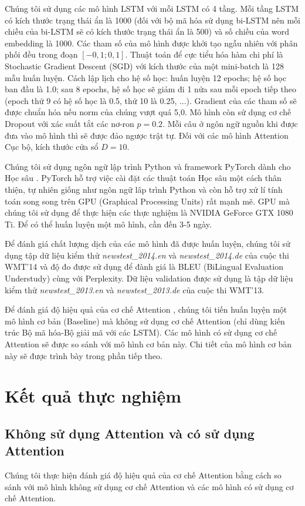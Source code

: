 Chúng tôi sử dụng các mô hình LSTM với mỗi LSTM có 4 tầng. Mỗi tầng LSTM có kích thước trạng thái ẩn là 1000 (đối với bộ mã hóa sử dụng bi-LSTM nên mỗi chiều của bi-LSTM sẽ có kích thước trạng thái ẩn là 500) và số chiều của word embedding là 1000. Các tham số của mô hình được khởi tạo ngẫu nhiên với phân phối đều trong đoạn $[-0,1; 0,1]$. Thuật toán để cực tiểu hóa hàm chi phí là Stochastic Gradient Descent (SGD) với kích thước của một mini-batch là 128 mẫu huấn luyện. Cách lập lịch cho hệ số học: huấn luyện 12 epochs; hệ số học ban đầu là 1.0; sau 8 epochs, hệ số học sẽ giảm đi 1 nửa sau mỗi epoch tiếp theo (epoch thứ 9 có hệ số học là 0.5, thứ 10 là 0.25, ...). Gradient của các tham số sẽ được chuẩn hóa nếu norm của chúng vượt quá 5,0. Mô hình còn sử dụng cơ chế Dropout với xác suất tắt các nơ-ron $p = 0.2$. Mỗi câu ở ngôn ngữ nguồn khi được đưa vào mô hình thì sẽ được đảo ngược trật tự. Đối với các mô hình Attention Cục bộ, kích thước cửa sổ $D = 10$.

Chúng tôi sử dụng ngôn ngữ lập trình Python và framework PyTorch dành cho Học sâu \cite{pytorchworkshop}. PyTorch hỗ trợ việc cài đặt các thuật toán Học sâu một cách thân thiện, tự nhiên giống như ngôn ngữ lâp trình Python và còn hỗ trợ xử lí tính toán song song trên GPU (Graphical Processing Units) rất mạnh mẽ. GPU mà chúng tôi sử dụng để thực hiện các thực nghiệm là NVIDIA GeForce GTX 1080 Ti. Để có thể huấn luyện một mô hình, cần đến 3-5 ngày.

Để đánh giá chất lượng dịch của các mô hình đã được huấn luyện, chúng tôi sử dụng tập dữ liệu kiểm thử \textit{newstest\_2014.en} và \textit{newstest\_2014.de} của cuộc thi WMT'14 và độ đo được sử dụng để đành giá là BLEU (BiLingual Evaluation Understudy) \cite{BLEUpaper} cùng với Perplexity. Dữ liệu validation được sử dụng là tập dữ liệu kiểm thử \textit{newstest\_2013.en} và \textit{newstest\_2013.de} của cuộc thi WMT'13.

Để đánh giá độ hiệu quả của cơ chế Attention , chúng tôi tiến huấn luyện một mô hình cơ bản (Baseline) mà không sử dụng cơ chế Attention (chỉ dùng kiến trúc Bộ mã hóa-Bộ giải mã với các LSTM). Các mô hình có sử dụng cơ chế Attention sẽ được so sánh với mô hình cơ bản này. Chi tiết của mô hình cơ bản này sẽ được trình bày trong phần tiếp theo.

\section{Kết quả thực nghiệm}
\subsection{Không sử dụng Attention và có sử dụng Attention}
Chúng tôi thực hiện đánh giá độ hiệu quả của cơ chế Attention bằng cách so sánh với mô hình không sử dụng cơ chế Attention và các mô hình có sử dụng cơ chế Attention.

